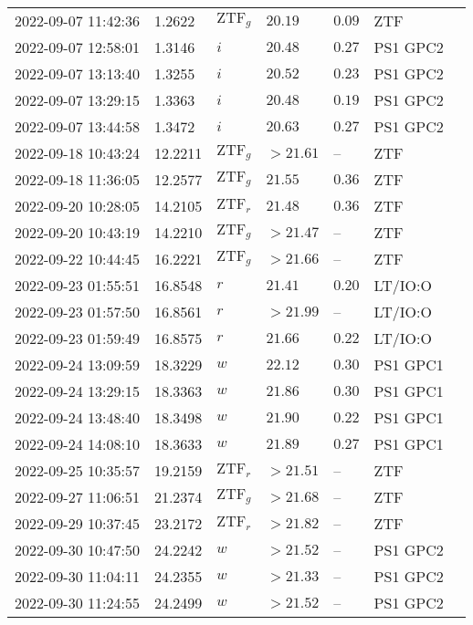 \documentclass{nature_plusfigure}
\begin{document}
\begin{supplement}
\begin{center}
\begin{longtable}{lllllll}
2022-09-07 11:42:36 & 1.2622 & $\mathrm{ZTF}_{g}$ & $20.19$ & $0.09$ & ZTF &  \\ 
2022-09-07 12:58:01 & 1.3146 & $i$ & $20.48$ & $0.27$ & PS1 GPC2 &  \\ 
2022-09-07 13:13:40 & 1.3255 & $i$ & $20.52$ & $0.23$ & PS1 GPC2 &  \\ 
2022-09-07 13:29:15 & 1.3363 & $i$ & $20.48$ & $0.19$ & PS1 GPC2 &  \\ 
2022-09-07 13:44:58 & 1.3472 & $i$ & $20.63$ & $0.27$ & PS1 GPC2 &  \\ 
2022-09-18 10:43:24 & 12.2211 & $\mathrm{ZTF}_{g}$ & $>21.61$ & -- & ZTF &  \\ 
2022-09-18 11:36:05 & 12.2577 & $\mathrm{ZTF}_{g}$ & $21.55$ & $0.36$ & ZTF &  \\ 
2022-09-20 10:28:05 & 14.2105 & $\mathrm{ZTF}_{r}$ & $21.48$ & $0.36$ & ZTF &  \\ 
2022-09-20 10:43:19 & 14.2210 & $\mathrm{ZTF}_{g}$ & $>21.47$ & -- & ZTF &  \\ 
2022-09-22 10:44:45 & 16.2221 & $\mathrm{ZTF}_{g}$ & $>21.66$ & -- & ZTF &  \\ 
2022-09-23 01:55:51 & 16.8548 & $r$ & $21.41$ & $0.20$ & LT/IO:O &  \\ 
2022-09-23 01:57:50 & 16.8561 & $r$ & $>21.99$ & -- & LT/IO:O &  \\ 
2022-09-23 01:59:49 & 16.8575 & $r$ & $21.66$ & $0.22$ & LT/IO:O &  \\ 
2022-09-24 13:09:59 & 18.3229 & $w$ & $22.12$ & $0.30$ & PS1 GPC1 &  \\ 
2022-09-24 13:29:15 & 18.3363 & $w$ & $21.86$ & $0.30$ & PS1 GPC1 &  \\ 
2022-09-24 13:48:40 & 18.3498 & $w$ & $21.90$ & $0.22$ & PS1 GPC1 &  \\ 
2022-09-24 14:08:10 & 18.3633 & $w$ & $21.89$ & $0.27$ & PS1 GPC1 &  \\ 
2022-09-25 10:35:57 & 19.2159 & $\mathrm{ZTF}_{r}$ & $>21.51$ & -- & ZTF &  \\ 
2022-09-27 11:06:51 & 21.2374 & $\mathrm{ZTF}_{g}$ & $>21.68$ & -- & ZTF &  \\ 
2022-09-29 10:37:45 & 23.2172 & $\mathrm{ZTF}_{r}$ & $>21.82$ & -- & ZTF &  \\ 
2022-09-30 10:47:50 & 24.2242 & $w$ & $>21.52$ & -- & PS1 GPC2 &  \\ 
2022-09-30 11:04:11 & 24.2355 & $w$ & $>21.33$ & -- & PS1 GPC2 &  \\ 
2022-09-30 11:24:55 & 24.2499 & $w$ & $>21.52$ & -- & PS1 GPC2 &  \\ 

\end{longtable}
\end{center}
\end{supplement}
\end{document}

